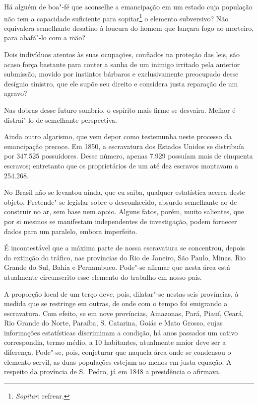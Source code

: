 Há alguém de boa"-fé que aconselhe a emancipação em um estado cuja
população não tem a capacidade suficiente para
sopitar\footnote{ \textit{Sopitar}: refrear.}
 o elemento subversivo? Não equivalera semelhante desatino à loucura do
homem que lançara fogo ao morteiro, para abafá"-lo com a mão?

Dois indivíduos atentos às suas ocupações, confiados na proteção das
leis, são acaso força bastante para conter a sanha de um inimigo
irritado pela anterior submissão, movido por instintos bárbaros e
exclusivamente preocupado desse desígnio sinistro, que ele supõe seu
direito e considera justa reparação de um agravo? 

Nas dobras desse futuro sombrio, o espírito mais firme se desvaira.
Melhor é distraí"-lo de semelhante perspectiva.

Ainda outro algarismo, que vem depor como testemunha neste processo da
emancipação precoce. Em 1850, a escravatura dos Estados Unidos se
distribuía por 347.525 possuidores. Desse número, apenas 7.929 possuíam
mais de cinquenta escravos; entretanto que os proprietários de um até
dez escravos montavam a 254.268.

No Brasil não se levantou ainda, que eu saiba, qualquer estatística
acerca deste objeto. Pretende"-se legislar sobre o desconhecido,
absurdo semelhante ao de construir no ar, sem base nem apoio. Alguns
fatos, porém, muito salientes, que por si mesmos se manifestam
independentes de investigação, podem fornecer dados para um paralelo,
embora imperfeito.

É incontestável que a máxima parte de nossa escravatura se concentrou,
depois da extinção do tráfico, nas províncias do Rio de Janeiro, São
Paulo, Minas, Rio Grande do Sul, Bahia e Pernambuco. Pode"-se afirmar
que nesta área está atualmente circunscrito esse elemento do trabalho
em nosso país.

A proporção local de um terço deve, pois, dilatar"-se nestas seis
províncias, à medida que se restringe em outras, de onde com o tempo
foi emigrando a escravatura. Com efeito, se em nove províncias,
Amazonas, Pará, Piauí, Ceará, Rio Grande do Norte, Paraíba, S.
Catarina, Goiás e Mato Grosso, cujas informações estatísticas
discriminam a condição, há anos passados um cativo correspondia, termo
médio, a 10 habitantes, atualmente maior deve ser a diferença.
Pode"-se, pois, conjeturar que naquela área onde se condensou o
elemento servil, as duas populações estejam ao menos em justa equação.
A respeito da província de S.~Pedro, já em 1848 a presidência o afirmava.

